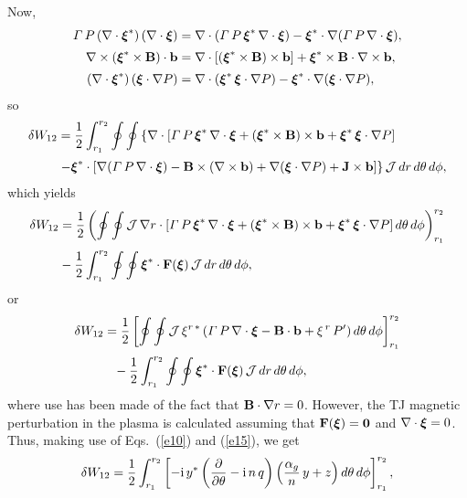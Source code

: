\documentclass[12pt,prb,aps,notitlepage]{revtex4-1}
\newcommand{\bxi}{\mbox{\boldmath$\xi$}}
\begin{document}
Now,
\begin{align}
{\mit\Gamma}\,P\,(\nabla\cdot\bxi^\ast)\,(\nabla\cdot\bxi)&=\nabla\cdot({\mit\Gamma}\,P\,\bxi^\ast\,\nabla\cdot\bxi)-\bxi^\ast\cdot\nabla(
{\mit\Gamma}\,P\,\nabla\cdot\bxi),\\[0.5ex]
 \nabla\times (\bxi^\ast\times {\bf B})\cdot {\bf b}&= \nabla\cdot[(\bxi^\ast\times {\bf B})\times {\bf b}] + \bxi^\ast\times {\bf B}\cdot\nabla\times {\bf b},\\[0.5ex]
 (\nabla\cdot\bxi^\ast)\,(\bxi\cdot\nabla P)&=\nabla\cdot(\bxi^\ast\,\bxi\cdot\nabla P) -\bxi^\ast\cdot\nabla(\bxi\cdot\nabla P),
\end{align}
so
\begin{align}
\delta W_{12} &= \frac{1}{2}\int_{r_1}^{r_2}\oint\oint\left\{\nabla\cdot[{\mit\Gamma}\,P\,\bxi^\ast\,\nabla\cdot\bxi+ (\bxi^\ast\times {\bf B})\times {\bf b}+\bxi^\ast\,\bxi\cdot\nabla P]\right.\nonumber\\[0.5ex]&\left.-\bxi^\ast\cdot[ \nabla({\mit\Gamma}\,P\,\nabla\cdot\bxi) - {\bf B}\times(\nabla\times {\bf b})+\nabla(\bxi\cdot\nabla P)+{\bf J}\times  {\bf b}]\right\}{\cal J}\,dr\,d\theta\,d\phi,
\end{align}
which yields
\begin{align}
\delta W_{12} &= \frac{1}{2}\left(\oint\oint{\cal J}\,\nabla r\cdot[{\mit\Gamma}\,P\,\bxi^\ast\,\nabla\cdot\bxi+ (\bxi^\ast\times {\bf B})\times {\bf b}+\bxi^\ast\,\bxi\cdot\nabla P]\,d\theta\,d\phi\right)_{r_1}^{r_2}\nonumber\\[0.5ex]
&-\frac{1}{2}\int_{r_1}^{r_2}\oint\oint \bxi^\ast\cdot{\bf F}(\bxi)\,{\cal J}\,dr\,d\theta\,d\phi,
\end{align}
or
\begin{align}
\delta W_{12} &= \frac{1}{2}\left[\oint\oint{\cal J}\,\xi^{r\,\ast}\,({\mit\Gamma}\,P\,\nabla\cdot\bxi -{\bf B}\cdot{\bf b} + \xi^{\,r}\,P')\,d\theta\,d\phi\right]_{r_1}^{r_2}\nonumber\\[0.5ex]&\phantom{=}-\frac{1}{2}\int_{r_1}^{r_2}\oint\oint\bxi^\ast\cdot{\bf F}(\bxi)\,{\cal J}\,dr\,d\theta\,d\phi,
\end{align}
where use has been made of the fact that ${\bf B}\cdot\nabla r = 0$.  However, the TJ magnetic perturbation in the plasma is calculated assuming that ${\bf F}(\bxi)={\bf 0}$ and
$\nabla\cdot\bxi=0$.   Thus, making use of Eqs.~(\ref{e10}) and (\ref{e15}), we get
\begin{equation}
\delta W_{12} = \frac{1}{2}\int_{r_1}^{r_2}\left[-{\rm i}\,y^\ast\left(\frac{\partial}{\partial\theta}-{\rm i}\,n\,q\right)\left(\frac{\alpha_g}{n}\,y+z\right)d\theta\,d\phi\right]_{r_1}^{r_2},
\end{equation}
\end{document}

